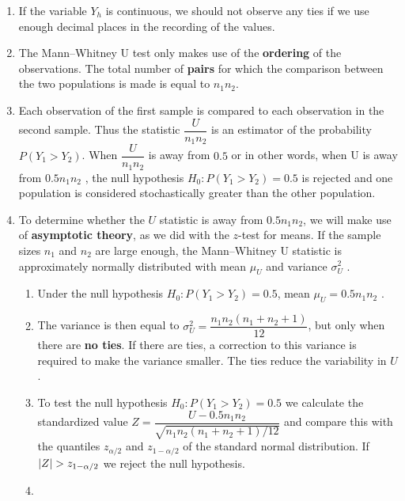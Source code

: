 \begin{enumerate}
    \item  If the variable $Y _h$ is continuous, we should not observe any ties if we use enough decimal places in the recording of the values.
    \hfill \cite{statistics/book/Statistics-for-Data-Scientists/Maurits-Kaptein}

    \item The Mann–Whitney U test only makes use of the \textbf{ordering} of the observations. 
    The total number of \textbf{pairs} for which the comparison between the two populations is made is equal to $n_1n_2 $. 
    \hfill \cite{statistics/book/Statistics-for-Data-Scientists/Maurits-Kaptein}

    \item Each observation of the first sample is compared to each observation in the second sample. 
    Thus the statistic $\dfrac{U}{n_1n_2}$ is an estimator of the probability $P(Y_1 > Y_2)$. 
    When $\dfrac{U}{n_1n_2}$ is away from $0.5$ or in other words, when U is away from $0.5n_1n_2$ , the null hypothesis $H_0 : P(Y_1 > Y_2) = 0.5$ is rejected and one population is considered stochastically greater than the other population.
    \hfill \cite{statistics/book/Statistics-for-Data-Scientists/Maurits-Kaptein}

    \item To determine whether the $U$ statistic is away from $0.5n_1n_2 $, we will make use of \textbf{asymptotic theory}, as we did with the $z$-test for means. 
    If the sample sizes $n_1$ and $n_2$ are large enough, the Mann–Whitney U statistic is approximately normally distributed with mean $\mu_U$ and variance $\sigma^2_U$ . 
    \hfill \cite{statistics/book/Statistics-for-Data-Scientists/Maurits-Kaptein}
    \begin{enumerate}
        \item Under the null hypothesis $H_0 : P(Y_1 > Y_2) = 0.5$, mean $\mu_U = 0.5n_1n_2$ .
        \hfill \cite{statistics/book/Statistics-for-Data-Scientists/Maurits-Kaptein}

        \item The variance is then equal to $\sigma^2 _U = \dfrac{n_1n_2(n_1 + n_2 + 1)}{12}$, but only when there are \textbf{no ties}.
        If there are ties, a correction to this variance is required to make the variance smaller. 
        The ties reduce the variability in $U $.
        \hfill \cite{statistics/book/Statistics-for-Data-Scientists/Maurits-Kaptein}
        
        \item To test the null hypothesis $H_0 : P(Y_1 > Y_2) = 0.5$ we calculate the standardized value $Z = \dfrac{U - 0.5n_1n_2}{\sqrt{n_1n_2(n_1 + n_2 + 1)/12}}$ and compare this with the quantiles $z_{\alpha/2}$ and $z_{1-\alpha/2}$ of the standard normal distribution. 
        If $\left| Z \right| > z_{1-\alpha/2}$ we reject the null hypothesis.
        \hfill \cite{statistics/book/Statistics-for-Data-Scientists/Maurits-Kaptein}

        \item 
        \hfill \cite{statistics/book/Statistics-for-Data-Scientists/Maurits-Kaptein}
    \end{enumerate}
\end{enumerate}
